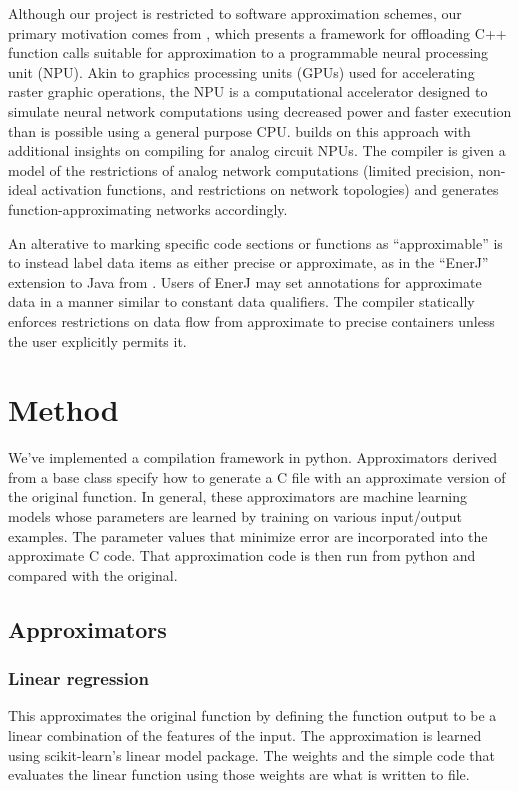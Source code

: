 \documentclass{article}
\begin{document}
Although our project is restricted to software approximation schemes, our primary motivation comes from \cite{Esmaeilzadeh12}, which presents a framework for offloading C++ function calls suitable for approximation to a programmable neural processing unit (NPU). Akin to graphics processing units (GPUs) used for accelerating raster graphic operations, the NPU is a computational accelerator designed to simulate neural network computations using decreased power and faster execution than is possible using a general purpose CPU. \cite{Amant14} builds on this approach with additional insights on compiling for analog circuit NPUs. The compiler is given a model of the restrictions of analog network computations (limited precision, non-ideal activation functions, and restrictions on network topologies) and generates function-approximating networks accordingly.

An alterative to marking specific code sections or functions as ``approximable'' is to instead label data items as either precise or approximate, as in the ``EnerJ'' extension to Java from \cite{Sampson11}. Users of EnerJ may set annotations for approximate data in a manner similar to constant data qualifiers. The compiler statically enforces restrictions on data flow from approximate to precise containers unless the user explicitly permits it.

\section{Method}

We've implemented a compilation framework in python. Approximators derived from a base class specify how to generate a C file with an approximate version of the original function. In general, these approximators are machine learning models whose parameters are learned by training on various input/output examples. The parameter values that minimize error are incorporated into the approximate C code. That approximation code is then run from python and compared with the original.

\subsection{Approximators}

\subsubsection{Linear regression}

This approximates the original function by defining the function output to be a linear combination of the features of the input. The approximation is learned using scikit-learn's linear model package. The weights and the simple code that evaluates the linear function using those weights are what is written to file.
\end{document}
